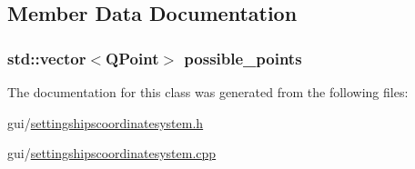 \subsection{Member Data Documentation}
\subsubsection[{\texorpdfstring{possible\+\_\+points}{possible_points}}]{\setlength{\rightskip}{0pt plus 5cm}std\+::vector$<$Q\+Point$>$ possible\+\_\+points\hspace{0.3cm}{\ttfamily [private]}}\hypertarget{classGUI_1_1SettingShipsCoordinateSystem_aa17adb05d9fe96ccd88569f02c6da0b2}{}\label{classGUI_1_1SettingShipsCoordinateSystem_aa17adb05d9fe96ccd88569f02c6da0b2}


The documentation for this class was generated from the following files\+:\begin{DoxyCompactItemize}
\item 
gui/\hyperlink{settingshipscoordinatesystem_8h}{settingshipscoordinatesystem.\+h}\item 
gui/\hyperlink{settingshipscoordinatesystem_8cpp}{settingshipscoordinatesystem.\+cpp}\end{DoxyCompactItemize}
